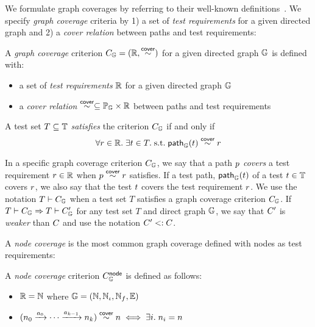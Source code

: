 We formulate graph coverages by referring to their well-known
definitions~\cite{testing}.
%
We specify \textit{graph coverage} criteria by 1) a set of \textit{test
requirements} for a given directed graph and 2) a \textit{cover relation}
between paths and test requirements:
\begin{definition}\label{def:graph-cov}
  A \textit{graph coverage} criterion $C_{\mathbb{G}} = (\mathbb{R}, \overset{\textsf{cover}}{\sim})$
  for a given directed graph $\mathbb{G}$ is defined with:
  \begin{itemize}
    \item a set of \textit{test requirements} $\mathbb{R}$ for a given
      directed graph $\mathbb{G}$
    \item a \textit{cover relation} $\overset{\textsf{cover}}{\sim} \subseteq \mathbb{P}_{\mathbb{G}} \times
      \mathbb{R}$ between paths and test requirements
  \end{itemize}
  A test set $T \subseteq \mathbb{T}$ \textit{satisfies} the criterion
  $C_{\mathbb{G}}$ if and only if
  \[
    \forall r \in \mathbb{R}. \; \exists t \in T. \;
    \text{s.t.} \; \textsf{path}_{\mathbb{G}}(t) \overset{\textsf{cover}}{\sim} r
  \]
\end{definition}


In a specific graph coverage criterion $C_{\mathbb{G}}$, we say that a path $p$
\textit{covers} a test requirement $r \in \mathbb{R}$ when $p \overset{\textsf{cover}}{\sim}
r$ satisfies.
%
If a test path, $\textsf{path}_{\mathbb{G}}(t)$ of a test $t \in \mathbb{T}$ covers
$r$, we also say that the test $t$ covers the test requirement $r$.
%
We use the notation $T \vdash C_{\mathbb{G}}$ when a test set $T$ satisfies a graph
coverage criterion $C_{\mathbb{G}}$.
%
If $T \vdash C_{\mathbb{G}} \Rightarrow T \vdash C_{\mathbb{G}}'$ for any test set $T$
and direct graph $\mathbb{G}$, we say that $C_{}'$ is \textit{weaker} than
$C_{}$ and use the notation $C_{}' <: C_{}$.
%

A \textit{node coverage} is the most common graph coverage defined with nodes as
test requirements:
\begin{definition}\label{def:node-cov}
  A \textit{node coverage} criterion $C_{\mathbb{G}}^{\textsf{node}}$ is defined as follows:
  \begin{itemize}
    \item $\mathbb{R} = \mathbb{N}$ where $\mathbb{G} = (\mathbb{N}, \mathbb{N}_\iota,
      \mathbb{N}_f, \mathbb{E})$
   \item $(n_0 \xrightarrow{a_0} \cdots \xrightarrow{a_{k-1}} n_k) \overset{\textsf{cover}}{\sim}
     n \iff \exists i. \; n_i = n$
  \end{itemize}
\end{definition}

